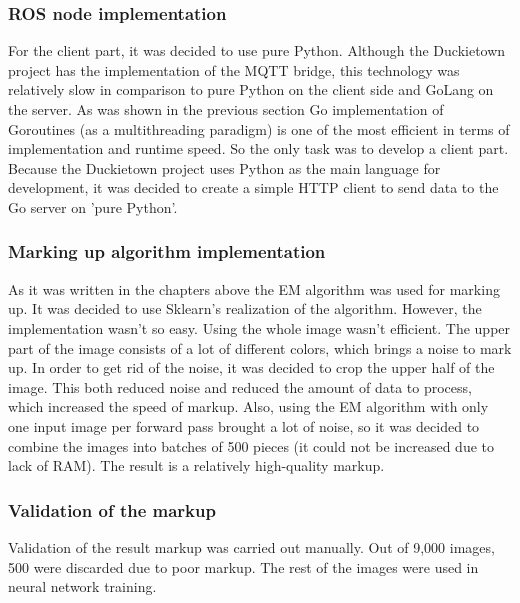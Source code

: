 \subsubsection{ROS node implementation}
For the client part, it was decided to use pure Python. Although the Duckietown project has the implementation of the MQTT bridge, 
this technology was relatively slow in comparison to pure Python on the client side and GoLang on the server. As was shown in the previous section Go implementation of 
Goroutines (as a multithreading paradigm) is one of the most efficient in terms of implementation and runtime speed. So the only task was to develop a client part. Because 
the Duckietown project uses Python as the main language for development, it was decided to create a simple HTTP client to send data to the Go server on 'pure Python'.
\subsubsection{Marking up algorithm implementation}
As it was written in the chapters above the EM algorithm was used for marking up. It was decided to use Sklearn's realization of the algorithm. 
However, the implementation wasn't so easy. Using the whole image wasn't efficient. The upper part of the image consists of a lot of different colors, 
which brings a noise to mark up. 
In order to get rid of the noise, it was decided to crop the upper half of the image. This both reduced noise and reduced the amount of data to process,
which increased the speed of markup.
Also, using the EM algorithm with only one input image per forward pass brought a lot of noise, so it was decided to combine the images into batches of 500 pieces 
(it could not be increased due to lack of RAM). The result is a relatively high-quality markup.
\subsubsection{Validation of the markup}
Validation of the result markup was carried out manually. Out of 9,000 images, 500 were discarded due to poor markup.
The rest of the images were used in neural network training.



